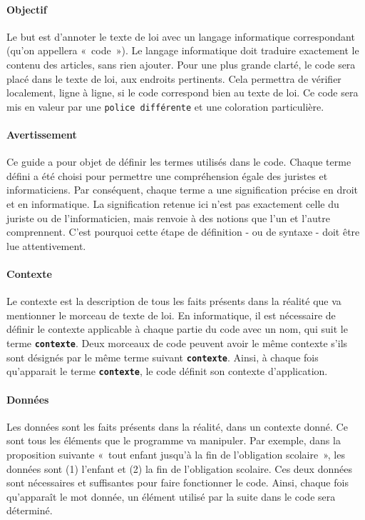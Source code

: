 \documentclass[12pt, french]{article}
\newcommand{\kw}[1]{\textbf{\textcolor{OliveGreen}{#1}}}
\newcommand{\inlinekw}[1]{\kw{\texttt{#1}}}
\begin{document}
\paragraph{Objectif} Le but est d’annoter le texte de loi avec un langage informatique correspondant (qu’on appellera « code »). Le langage informatique doit traduire exactement le contenu des articles, sans rien ajouter. Pour une plus grande clarté, le code sera placé dans le texte de loi, aux endroits pertinents. Cela permettra de vérifier localement, ligne à ligne, si le code correspond bien au texte de loi. Ce code sera mis en valeur par une \verb|police différente| et une \textcolor{OliveGreen}{coloration particulière}.

\paragraph{Avertissement} Ce guide a pour objet de définir les termes utilisés dans le code. Chaque terme défini a été choisi pour permettre une compréhension égale des juristes et informaticiens. Par conséquent, chaque terme a une signification précise en droit et en informatique. La signification retenue ici n’est pas exactement celle du juriste ou de l’informaticien, mais renvoie à des notions que l’un et l’autre comprennent. C’est pourquoi cette étape de définition - ou de syntaxe - doit être lue attentivement.

\paragraph{Contexte} Le contexte est la description de tous les faits présents dans la réalité que va mentionner le morceau de texte de loi. En informatique, il est nécessaire de définir le contexte applicable à chaque partie du code avec un nom, qui suit le terme \inlinekw{contexte}. Deux morceaux de code peuvent avoir le même contexte s’ils sont désignés par le même terme suivant \inlinekw{contexte}. Ainsi, à chaque fois qu’apparait le terme \inlinekw{contexte}, le code définit son contexte d’application.

\paragraph{Données} Les données sont les faits présents dans la réalité, dans un contexte donné. Ce sont tous les éléments que le programme va manipuler. Par exemple, dans la proposition suivante « tout enfant jusqu’à la fin de l’obligation scolaire », les données sont (1) l'enfant  et (2) la fin de l’obligation scolaire. Ces deux données sont nécessaires et suffisantes pour faire fonctionner le code. Ainsi, chaque fois qu’apparaît le mot donnée, un élément utilisé par la suite dans le code sera déterminé.
\end{document}
